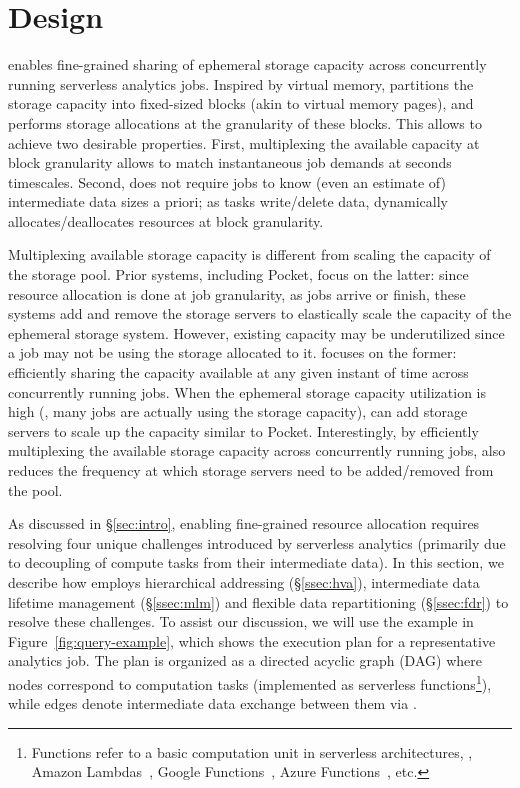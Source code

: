 \section{\jiffy Design}
\label{sec:jiffydesign}

\jiffy enables fine-grained sharing of ephemeral storage capacity across concurrently running serverless analytics jobs. Inspired by virtual memory, \jiffy partitions the storage capacity into fixed-sized blocks (akin to virtual memory pages), and performs storage allocations at the granularity of these blocks. This allows \jiffy to achieve two desirable properties. First, multiplexing the available capacity at block granularity allows \jiffy to match instantaneous job demands at seconds timescales. Second, \jiffy does not require jobs to know (even an estimate of) intermediate data sizes a priori; as tasks write/delete data, \jiffy dynamically allocates/deallocates resources at block granularity. 

 Multiplexing available storage capacity is different from scaling the capacity of the storage pool. Prior systems, including Pocket, focus on the latter: since resource allocation is done at job granularity, as jobs arrive or finish, these systems add and remove the storage servers to elastically scale the capacity of the ephemeral storage system. However, existing capacity may be underutilized since a job may not be using the storage allocated to it. \jiffy focuses on the former: efficiently sharing the capacity available at any given instant of time across concurrently running jobs. When the ephemeral storage capacity utilization is high (\ie, many jobs are actually using the storage capacity), \jiffy can add storage servers to scale up the capacity similar to Pocket. Interestingly, by efficiently multiplexing the available storage capacity across concurrently running jobs, \jiffy also reduces the frequency at which storage servers need to be added/removed from the pool.

As discussed in \S\ref{sec:intro}, enabling fine-grained resource allocation requires resolving four unique challenges introduced by serverless analytics (primarily due to decoupling of compute tasks from their intermediate data). In this section, we describe how \jiffy employs hierarchical addressing (\S\ref{ssec:hva}), intermediate data lifetime management (\S\ref{ssec:mlm}) and flexible data repartitioning (\S\ref{ssec:fdr}) to resolve these challenges. To assist our discussion, we will use the example in Figure~\ref{fig:query-example}, which shows the execution plan for a representative analytics job. The plan is organized as a directed acyclic graph (DAG) where nodes correspond to computation tasks (implemented as serverless functions\footnote{Functions refer to a basic computation unit in serverless architectures, \eg, Amazon Lambdas~\cite{alambda}, Google Functions~\cite{googlefunctions}, Azure Functions~\cite{azureFunctions}, etc.}), while edges denote intermediate data exchange between them via \jiffy. 

